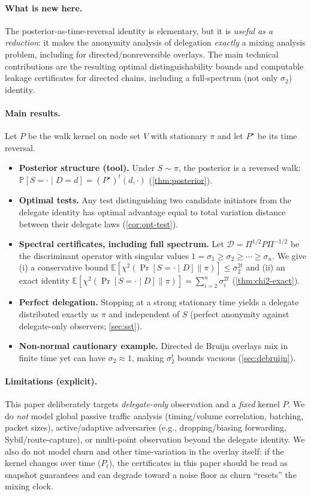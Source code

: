 \documentclass[11pt]{article}
\newcommand{\E}{\mathbb{E}}
\newcommand{\Prb}{\mathbb{P}}
\newcommand{\cD}{\mathcal{D}}
\begin{document}
\paragraph{What is new here.}
The posterior-as-time-reversal identity is elementary, but it is \emph{useful as
a reduction}: it makes the anonymity analysis of delegation \emph{exactly} a
mixing analysis problem, including for directed/nonreversible overlays. The
main technical contributions are the resulting optimal distinguishability bounds
and computable leakage certificates for directed chains, including a
full-spectrum (not only $\sigma_2$) identity.

\paragraph{Main results.}
Let $P$ be the walk kernel on node set $V$ with stationary $\pi$ and let $P^\star$
be its time reversal.
\begin{itemize}[leftmargin=1.2em]
\item \textbf{Posterior structure (tool).} Under $S\sim\pi$, the posterior is a
reversed walk: $\Prb[S=\cdot\mid D=d]=(P^\star)^t(d,\cdot)$ (\cref{thm:posterior}).
\item \textbf{Optimal tests.} Any test distinguishing two candidate initiators
from the delegate identity has optimal advantage equal to total variation
distance between their delegate laws (\cref{cor:opt-test}).
\item \textbf{Spectral certificates, including full spectrum.} Let
$\cD=\Pi^{1/2}P\Pi^{-1/2}$ be the discriminant operator with singular values
$1=\sigma_1\ge\sigma_2\ge\cdots\ge\sigma_n$. We give (i) a conservative bound
$\E[\chi^2(\Pr[S=\cdot\mid D]\|\pi)]\le\sigma_2^{2t}$ and (ii) an exact identity
$\E[\chi^2(\Pr[S=\cdot\mid D]\|\pi)]=\sum_{i=2}^n\sigma_i^{2t}$
(\cref{thm:chi2-exact}).
\item \textbf{Perfect delegation.} Stopping at a strong stationary time yields a
delegate distributed exactly as $\pi$ and independent of $S$ (perfect anonymity
against delegate-only observers; \cref{sec:sst}).
\item \textbf{Non-normal cautionary example.} Directed de Bruijn overlays mix in
finite time yet can have $\sigma_2\approx 1$, making $\sigma_2^t$ bounds vacuous
(\cref{sec:debruijn}).
\end{itemize}

\paragraph{Limitations (explicit).}
This paper deliberately targets \emph{delegate-only} observation and a
\emph{fixed} kernel $P$. We do \emph{not} model global passive traffic analysis
(timing/volume correlation, batching, packet sizes), active/adaptive adversaries
(e.g., dropping/biasing forwarding, Sybil/route-capture), or multi-point
observation beyond the delegate identity. We also do not model churn and other
time-variation in the overlay itself: if the kernel changes over time
($P_t$), the certificates in this paper should be read as snapshot guarantees
and can degrade toward a noise floor as churn ``resets'' the mixing clock.
\end{document}
